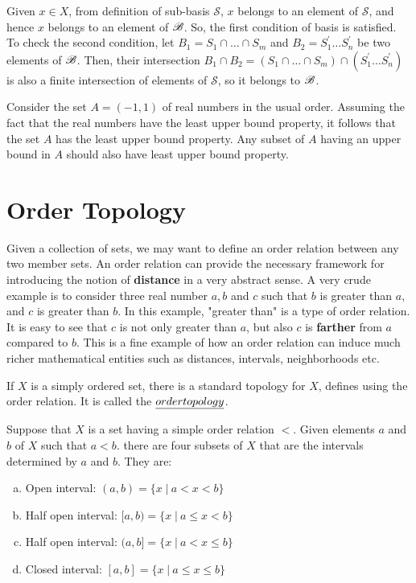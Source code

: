\documentclass[a4paper,english,12pt]{article}
\begin{document}
Given $x \in X$, from definition of sub-basis $\mathcal{S}$, $x$ belongs to an element of $\mathcal{S}$, and hence $x$ belongs to an element of $\mathscr{B}$. So, the first condition of basis is satisfied. To check the second condition, let $B_{1} = S_{1} \cap \dots \cap S_{m}$ and $B_{2} = S_{1}^{'} \dots S_{n}^{'}$ be two elements of $\mathscr{B}$. Then, their intersection $B_{1} \cap B_{2} = (S_{1} \cap \dots \cap S_{m})  \cap (S_{1}^{'} \dots S_{n}^{'})$ is also a finite intersection of elements of $\mathcal{S}$, so it belongs to $\mathscr{B}$. 

\begin{exmp}
\begin{enumerate}[i)]
Consider the set $A = (-1, 1)$ of real numbers in the usual order. Assuming the fact that the real numbers have the least upper bound property, it follows that the set $A$ has the least upper bound property. Any subset of $A$ having an upper bound in $A$ should also have least upper bound property. 
\end{enumerate}
\end{exmp}

\section{Order Topology}
Given a collection of sets, we may want to define an order relation between any two member sets. An order relation can provide the necessary framework for introducing the notion of \textbf{distance} in a very abstract sense. A very crude example is to consider three real number $a, b$ and $c$ such that $b$
is greater than $a$, and $c$ is greater than $b$. In this example, "greater than" is a type of order relation. It is easy to see that $c$ is not only greater than $a$, but also $c$ is \textbf{farther} from $a$ compared to $b$. This is a fine example of how an order relation can induce much richer mathematical entities such as distances, intervals, neighborhoods etc.  

If $X$ is a simply ordered set, there is a standard topology for $X$, defines using the order relation. It is called the $\emph{order topology}$.

Suppose that $X$ is a set having a simple order relation $<$. Given elements $a$ and $b$ of $X$ such that $a < b$. there are four subsets of $X$ that are the intervals determined by $a$ and $b$. They are:
\begin{enumerate}[a)]
\item Open interval: $(a, b) = \{ x\; | \: a < x < b  \}$
\item Half open interval: $[a, b) = \{ x\; | \: a \le x < b  \}$
\item Half open interval: $(a, b] = \{ x\; | \: a < x \le b  \}$
\item Closed interval: $[a, b] = \{ x\; | \: a \le x \le b  \}$
\end{enumerate} 
\end{document}
